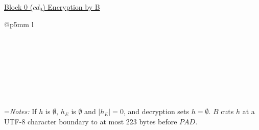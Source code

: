 \documentclass{article}
\newlength{\stanzagap}
\newlength{\notegap}
\newlength{\stanzawidth}
\newlength{\stanzabox}
\newenvironment{stanza}[1][\stanzawidth]
  {\par\addvspace{\stanzagap}%
   \setlength{\stanzabox}{\dimexpr\linewidth-\parindent\relax}%
   \ifdim\stanzabox>#1\setlength{\stanzabox}{#1}\fi
   \noindent\hspace*{\parindent}\begin{minipage}{\stanzabox}}
  {\end{minipage}\par\addvspace{\stanzagap}}
\begin{document}
\begin{stanza}
\underline{Block 0 ($\mathit{cd}_0$) Encryption by B}\\

\begin{tabular}{@{}p{5mm} l}
\\
\\
\\
\\
\\
\\
\\
\\
\end{tabular}

\vspace{\notegap}

{\leftskip=\parindent\noindent\textit{Notes:} If $h$ is $\emptyset$, $h_E$ is $\emptyset$ and $|h_E| = 0$, and decryption sets $h = \emptyset$. $B$ cuts $h$ at a UTF-8 character boundary to at most 223 bytes before $\mathit{PAD}$.\par}
\end{stanza}
\end{document}
